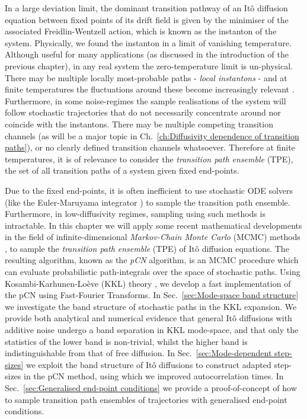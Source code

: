 In a large deviation limit, the dominant transition pathway of an Itô diffusion equation between fixed points of its drift field is given by the minimiser of the associated Freidlin-Wentzell action, which is known as the instanton of the system. Physically, we found the instanton in a limit of vanishing temperature. Although useful for many applications (as discussed in the introduction of the previous chapter), in any real system the zero-temperature limit is un-physical. There may be multiple locally most-probable paths - \textit{local instantons} - and at finite temperatures the fluctuations around these become increasingly relevant \citep{gelfandIntegrationFunctionalSpaces1960a, nickelsenNoiseCorrectionLarge2022, corazzaNormalizedGaussianPath2020b, luGaussianApproximationsTransition2017a}. Furthermore, in some noise-regimes the sample realisations of the system will follow stochastic trajectories that do not necessarily concentrate around nor coincide with the instantons. There may be multiple competing transition channels (as will be a major topic in Ch.~\ref{ch:Diffusivity dependence of transition paths}), or no clearly defined transition channels whatsoever. Therefore at finite temperatures, it is of relevance to consider the \textit{transition path ensemble} (TPE), the set of all transition paths of a system given fixed end-points.

Due to the fixed end-points, it is often inefficient to use stochastic ODE solvers (like the Euler-Maruyama integrator \citep{kloedenNumericalSolutionStochastic2011}) to sample the transition path ensemble. Furthermore, in low-diffusivity regimes, sampling using such methods is intractable. In this chapter we will apply some recent mathematical developments in the field of infinite-dimensional \textit{Markov-Chain Monte Carlo} (MCMC) methods \citep{cotterMCMCMethodsFunctions2013a, beskosMCMCMETHODSDIFFUSION2008a, hairerAnalysisSPDEsArising2005a, hairerAnalysisSPDEsArising2007a, hairerSpectralGapsMetropolis2014a}, to sample the \textit{transition path ensemble} (TPE) of Itô diffusion equations. The resulting algorithm, known as the \textit{pCN} algorithm, is an MCMC procedure which can evaluate probabilistic path-integrals over the space of stochastic paths. Using Kosambi-Karhunen-Lo\`eve (KKL) theory \citep{kosambiParallelismPathspaces2016, karhunenUeberLineareMethoden1947, loeveProbabilityTheory1977a}, we develop a fast implementation of the pCN using Fast-Fourier Transforms. In Sec.~\ref{sec:Mode-space band structure} we investigate the band structure of stochastic paths in the KKL expansion. We provide both analytical and numerical evidence that general It\^{o} diffusions with additive noise undergo a band separation in KKL mode-space, and that only the statistics of the lower band is non-trivial, whilst the higher band is indistinguishable from that of free diffusion. In Sec.~\ref{sec:Mode-dependent step-sizes} we exploit the band structure of It\^{o} diffusions to construct adapted step-sizes in the pCN method, using which we improved autocorrelation times. In Sec.~\ref{sec:Generalised end-point conditions} we provide a proof-of-concept of how to sample transition path ensembles of trajectories with generalised end-point conditions.

